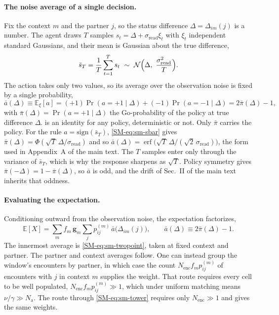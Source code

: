 \documentclass[
  aps,prx,
  preprint,
  superscriptaddress,
  nofootinbib
]{revtex4-2}
\newcommand{\g}{\mathbf{g}}
\newcommand{\sread}{\sigma_{\mathrm{read}}}
\newcommand{\sign}{\mathrm{sign}}
\newcommand{\pibar}{\bar\pi}
\newcommand{\Nag}{N_{\mathrm{a}}}
\begin{document}
\paragraph{The noise average of a single decision.} Fix the context $m$ and the partner $j$, so the status difference $\Delta=\Delta_{im}(j)$ is a number. The agent draws $T$ samples $s_t=\Delta+\sread\xi_t$ with $\xi_t$ independent standard Gaussians, and their mean is Gaussian about the true difference,
\begin{equation}\label{SM-eq:sm-sbar}
\bar s_T=\frac1T\sum_{t=1}^{T}s_t\ \sim\ \mathcal N\Bigl(\Delta,\ \frac{\sread^2}{T}\Bigr).
\end{equation}
The action takes only two values, so its average over the observation noise is fixed by a single probability,
\begin{equation}\label{SM-eq:sm-twopoint}
\bar a(\Delta)\equiv\mathbb E_\xi[a]=(+1)\Pr(a{=}{+}1\mid\Delta)+(-1)\Pr(a{=}{-}1\mid\Delta)=2\pibar(\Delta)-1 ,
\end{equation}
with $\pibar(\Delta)=\Pr(a{=}{+}1\mid\Delta)$ the Go-probability of the policy at true difference $\Delta$.  is an identity for any policy, deterministic or not. Only $\pibar$ carries the policy. For the rule $a=\sign(\bar s_T)$, \cref{SM-eq:sm-sbar} gives $\pibar(\Delta)=\Phi(\sqrt T\,\Delta/\sread)$ and so $\bar a(\Delta)=\operatorname{erf}\bigl(\sqrt T\,\Delta/(\sqrt2\,\sread)\bigr)$, the form used in Appendix~A of the main text. The $T$ samples enter only through the variance of $\bar s_T$, which is why the response sharpens as $\sqrt T$. Policy symmetry gives $\pibar(-\Delta)=1-\pibar(\Delta)$, so $\bar a$ is odd, and the drift of Sec.~II of the main text inherits that oddness.

\paragraph{Evaluating the expectation.} Conditioning outward from the observation noise, the expectation factorizes,
\begin{equation}\label{SM-eq:sm-tower}
\mathbb E[X]=\sum_m f_m\,\g_m\sum_j p^{(m)}_{ij}\,\bar a\bigl(\Delta_{im}(j)\bigr),\qquad \bar a(\Delta)\equiv2\pibar(\Delta)-1 .
\end{equation}
The innermost average is \cref{SM-eq:sm-twopoint}, taken at fixed context and partner. The partner and context averages follow. One can instead group the window's encounters by partner, in which case the count $N_{\mathrm{enc}}f_mp^{(m)}_{ij}$ of encounters with $j$ in context $m$ supplies the weight. That route requires every cell to be well populated, $N_{\mathrm{enc}}f_mp^{(m)}_{ij}\gg1$, which under uniform matching means $\nu/\gamma\gg\Nag$. The route through \cref{SM-eq:sm-tower} requires only $N_{\mathrm{enc}}\gg1$ and gives the same weights.
\end{document}
